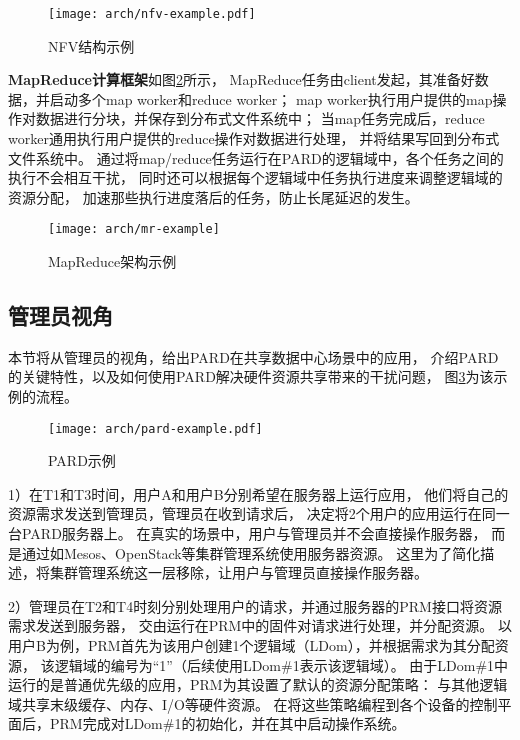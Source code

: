 \begin{figure}[htb]
  \centering
  \texttt{[image: arch/nfv-example.pdf]}
  \caption{NFV结构示例\cite{etsi_nfv_2014}}
  \label{fig:nfv-example}
\end{figure}


\textbf{MapReduce计算框架}如图\ref{fig:mr-example}所示，
MapReduce任务由client发起，其准备好数据，并启动多个map worker和reduce worker；
map worker执行用户提供的map操作对数据进行分块，并保存到分布式文件系统中；
当map任务完成后，reduce worker通用执行用户提供的reduce操作对数据进行处理，
并将结果写回到分布式文件系统中。
通过将map/reduce任务运行在PARD的逻辑域中，各个任务之间的执行不会相互干扰，
同时还可以根据每个逻辑域中任务执行进度来调整逻辑域的资源分配，
加速那些执行进度落后的任务，防止长尾延迟的发生。

\begin{figure}[htb]
  \centering
  \texttt{[image: arch/mr-example]}
  \caption{MapReduce架构示例}
  \label{fig:mr-example}
\end{figure}


\subsection{管理员视角}

本节将从管理员的视角，给出PARD在共享数据中心场景中的应用，
介绍PARD的关键特性，以及如何使用PARD解决硬件资源共享带来的干扰问题，
图\ref{fig:pard-example}为该示例的流程。

\begin{figure}[b]
  \centering
  \texttt{[image: arch/pard-example.pdf]}
  \caption{PARD示例}
  \label{fig:pard-example}
\end{figure}

1）在T1和T3时间，用户A和用户B分别希望在服务器上运行应用，
他们将自己的资源需求发送到管理员，管理员在收到请求后，
决定将2个用户的应用运行在同一台PARD服务器上。
在真实的场景中，用户与管理员并不会直接操作服务器，
而是通过如Mesos\cite{Hindman:2011:Mesos}、OpenStack\cite{OpenStack}等集群管理系统使用服务器资源。
这里为了简化描述，将集群管理系统这一层移除，让用户与管理员直接操作服务器。

2）管理员在T2和T4时刻分别处理用户的请求，并通过服务器的PRM接口将资源需求发送到服务器，
交由运行在PRM中的固件对请求进行处理，并分配资源。
以用户B为例，PRM首先为该用户创建1个逻辑域（LDom），并根据需求为其分配资源，
该逻辑域的编号为``1''（后续使用LDom\#1表示该逻辑域）。
由于LDom\#1中运行的是普通优先级的应用，PRM为其设置了默认的资源分配策略：
与其他逻辑域共享末级缓存、内存、I/O等硬件资源。
在将这些策略编程到各个设备的控制平面后，PRM完成对LDom\#1的初始化，并在其中启动操作系统。

